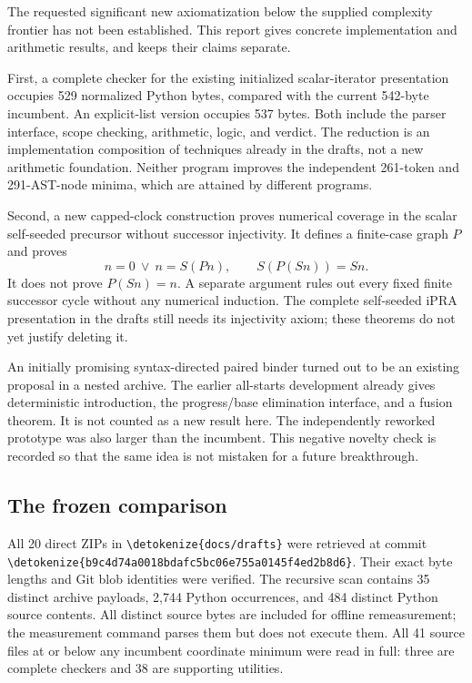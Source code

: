 \documentclass[11pt,letterpaper]{article}
\theoremstyle{definition}\newtheorem{definition}[theorem]{Definition}
\theoremstyle{remark}\newtheorem{remark}[theorem]{Remark}
\newcommand{\file}[1]{\expandafter\nolinkurl\expandafter{\detokenize{#1}}}
\begin{document}
The requested significant new axiomatization below the supplied complexity
frontier has not been established. This report gives concrete implementation
and arithmetic results, and keeps their claims separate.

First, a complete checker for the existing initialized scalar-iterator
presentation occupies 529 normalized Python bytes, compared with the current
542-byte incumbent. An explicit-list version occupies 537 bytes. Both include
the parser interface, scope checking, arithmetic, logic, and verdict. The
reduction is an implementation composition of techniques already in the
drafts, not a new arithmetic foundation. Neither program improves the independent
261-token and 291-AST-node minima, which are attained by different programs.

Second, a new capped-clock construction proves numerical coverage in the
scalar self-seeded precursor without successor injectivity. It defines a
finite-case graph $P$ and proves
\[
 n=0\ \lor\ n=S(Pn),\qquad S(P(Sn))=Sn.
\]
It does not prove $P(Sn)=n$. A separate argument rules out every fixed finite
successor cycle without any numerical induction. The complete self-seeded
iPRA presentation in the drafts still needs its injectivity axiom; these
theorems do not yet justify deleting it.

An initially promising syntax-directed paired binder turned out to be an
existing proposal in a nested archive. The earlier all-starts development
already gives deterministic introduction, the progress/base elimination
interface, and a fusion theorem. It is not counted as a new result here.
The independently reworked prototype was also larger than the incumbent.
This negative novelty check is recorded so that the same idea is not
mistaken for a future breakthrough.\cite{allstarts}

\subsection{The frozen comparison}

All 20 direct ZIPs in \file{docs/drafts} were retrieved at commit
\file{b9c4d74a0018bdafc5bc06e755a0145f4ed2b8d6}. Their exact byte lengths
and Git blob identities were verified. The recursive scan contains 35 distinct
archive payloads, 2,744 Python occurrences, and 484 distinct Python source
contents. All distinct source bytes are included for offline remeasurement;
the measurement command parses them but does not execute them. All 41
source files at or below any incumbent coordinate minimum were read in full:
three are complete checkers and 38 are supporting utilities.
\end{document}
